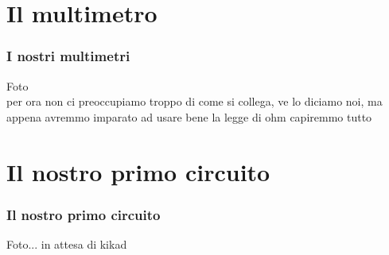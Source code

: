 	\section{Il multimetro} %
	\label{sec:il_multimetro}
		\begin{frame}[c]\frametitle{I nostri multimetri}
		    
			Foto\\

			per ora non ci preoccupiamo troppo di come si collega, ve lo diciamo noi, ma appena avremmo imparato ad usare bene la legge di ohm capiremmo tutto		
		\end{frame}

	\section{Il nostro primo circuito} %
	\label{sec:il_nostro_primo_circuito}

		\begin{frame}[c]\frametitle{Il nostro primo circuito}
			    
					Foto... in attesa di kikad
		
		\end{frame}	

